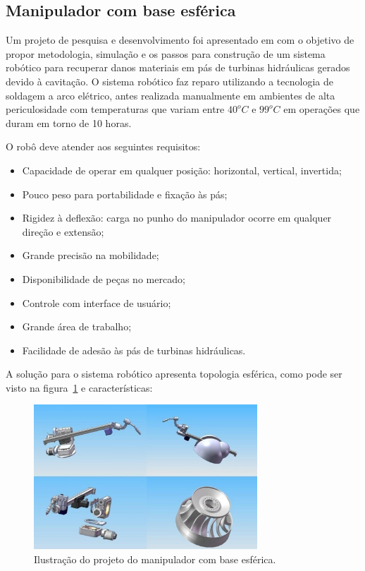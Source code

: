 \subsection{Manipulador com base esférica}
Um projeto de pesquisa e desenvolvimento foi apresentado em
\cite{motta2010prototype} com o objetivo de propor metodologia, simulação e
os passos para construção de um sistema robótico para recuperar danos materiais
em pás de turbinas hidráulicas gerados devido à cavitação. O sistema robótico faz
reparo utilizando a tecnologia de soldagem a arco elétrico, antes realizada
manualmente em ambientes de alta periculosidade com temperaturas que variam
entre $40^o C$ e $99^o C$ em operações que duram em torno de 10 horas. 

O robô deve atender aos seguintes requisitos:
\begin{itemize}
  \item Capacidade de operar em qualquer posição: horizontal, vertical,
  invertida;
  \item Pouco peso para portabilidade e fixação às pás;
  \item Rigidez à deflexão: carga no punho do manipulador ocorre em qualquer
  direção e extensão;
  \item Grande precisão na mobilidade;
  \item Disponibilidade de peças no mercado;
  \item Controle com interface de usuário;
  \item Grande área de trabalho;
  \item Facilidade de adesão às pás de turbinas hidráulicas.
\end{itemize}

A solução para o sistema robótico apresenta topologia esférica, como pode ser
visto na figura~\ref{fig:esferico} e características:

\begin{figure}[ht]
\centering
\includegraphics[width=8.4cm]{figs/esferico/esferico.jpg}
\caption{Ilustração do projeto do manipulador com base esférica.}
\label{fig:esferico}
\end{figure}

